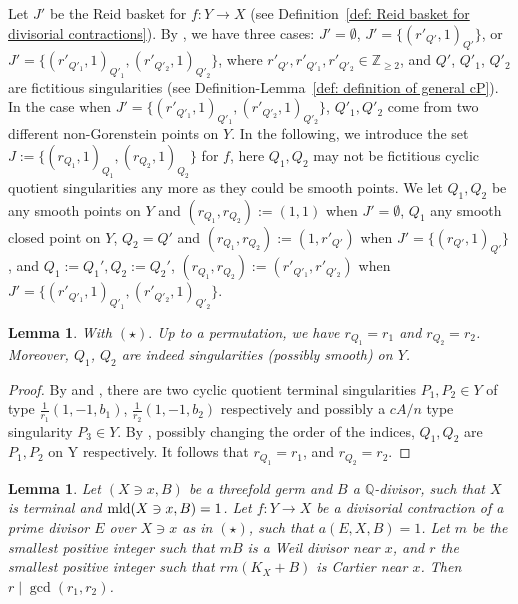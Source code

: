 \documentclass[11pt]{amsart}
\numberwithin{equation}{section}
\newcommand{\Qq}{\mathbb{Q}}
\newcommand{\mld}{{\rm{mld}}}
\newtheorem{lem}[thm]{Lemma}
\theoremstyle{definition}
\theoremstyle{definition}
\begin{document}
Let $J'$ be the Reid basket for $f: Y\to X$ (see Definition~\ref{def: Reid basket for divisorial contractions}). By \cite[Theorem~1.2]{Kaw05}, we have three cases: $J'=\emptyset$, $J'=\{(r'_{Q'},1)_{Q'}\}$, or $J'=\{(r'_{Q'_1},1)_{Q'_1},(r'_{Q'_2},1)_{Q'_2}\}$, where $r'_{Q'},r'_{Q'_1},r'_{Q'_2}\in \mathbb{Z}_{\geq 2}$, and $Q'$, $Q'_1$, $Q'_2$ are fictitious singularities (see Definition-Lemma~\ref{def: definition of general cP}). In the case when $J'=\{(r'_{Q'_1},1)_{Q'_1},(r'_{Q'_2},1)_{Q'_2}\}$, $Q'_1,Q'_2$ come from two different non-Gorenstein points on $Y$. In the following, we introduce the set $J:=\{(r_{Q_1},1)_{Q_1},(r_{Q_2},1)_{Q_2}\}$ for $f$, here $Q_1,Q_2$ may not be fictitious cyclic quotient singularities any more as they could be smooth points. We let $Q_1,Q_2$ be any smooth points on $Y$ and $(r_{Q_1},r_{Q_2}):=(1,1)$ when $J'=\emptyset$, $Q_1$ any smooth closed point on $Y$, $Q_2=Q'$ and $(r_{Q_1},r_{Q_2}):=(1,r'_{Q'})$ when $J'=\{(r_{Q'},1)_{Q'}\}$, and $Q_1:=Q_1',Q_2:=Q_2'$, $(r_{Q_1},r_{Q_2}):=(r'_{Q'_1},r'_{Q'_2})$ when $J'=\{(r'_{Q'_1},1)_{Q'_1},(r'_{Q'_2},1)_{Q'_2}\}$.



\begin{lem}\label{lem: the blow up index coincide with the reid basket index}
With  $(\star).$ Up to a permutation, we have $r_{Q_1}=r_1$ and $r_{Q_2}=r_2$. Moreover, $Q_1$, $Q_2$ are indeed singularities (possibly smooth) on $Y$.
\end{lem}

\begin{proof}
By \cite[Theorem~6.5, Page 112, Line 12-14]{Kaw05} and \cite[Proposition~2.15, Page 9, Line 15]{CH11}, there are two cyclic quotient terminal singularities $P_1,P_2\in Y$ of type $\frac{1}{r_1}(1,-1,b_1)$, $\frac{1}{r_2}(1,-1,b_2)$ respectively and possibly a $cA/n$ type singularity $P_3\in Y$. By \cite[Theorem~4.3]{Kaw05}, possibly changing the order of the indices, $Q_1, Q_2$ are $P_1,P_2$ on Y respectively. It follows that $r_{Q_1}=r_1$, and $r_{Q_2}=r_2$.
\end{proof}


\begin{lem}\label{lem: unboundness of r1 and r2}
Let $(X\ni x, B)$ be a threefold germ and $B$ a $\Qq$-divisor, such that $X$ is terminal and $\mld(X\ni x, B)=1$. Let $f: Y\to X$ be a divisorial contraction of a prime divisor $E$ over $X\ni x$ as in  $(\star)$, such that $a(E,X,B)=1$. Let $m$ be the smallest positive integer such that $mB$ is a Weil divisor near $x$, and $r$ the smallest positive integer such that $rm(K_X+B)$ is Cartier near $x$. Then $r\mid \gcd(r_1,r_2)$.
\end{lem}
\end{document}
